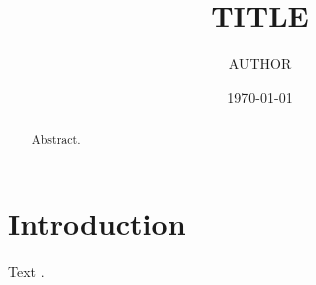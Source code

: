 \documentclass[aps,prd,reprint,amsmath,amssymb]{revtex4-2}
\begin{document}
\title{{{TITLE}}}
\author{{{AUTHOR}}}
\date{\today}
\begin{abstract}
Abstract.
\end{abstract}
\maketitle
\section{Introduction}
Text \cite{example2024}.

\end{document}
